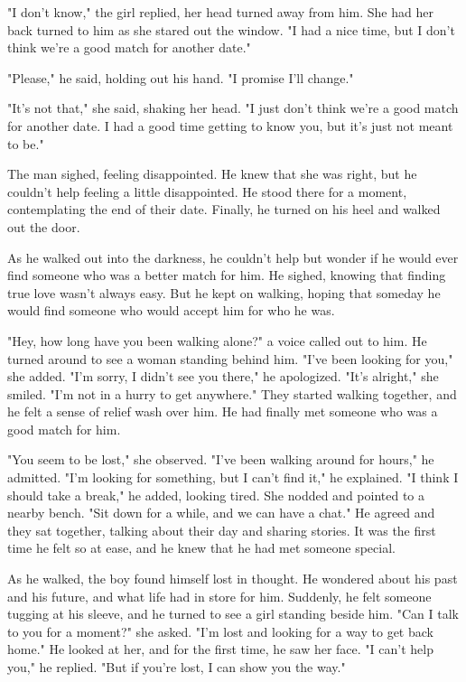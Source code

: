 \documentclass[smalldemyvopaper,11pt,twoside,onecolumn,openright,extrafontsizes]{memoir}
\begin{document}
"I don't know," the girl replied, her head turned away from him. She had her back turned to him as she stared out the window. "I had a nice time, but I don't think we're a good match for another date."\par
"Please," he said, holding out his hand. "I promise I'll change."\par
"It's not that," she said, shaking her head. "I just don't think we're a good match for another date. I had a good time getting to know you, but it's just not meant to be."\par
The man sighed, feeling disappointed. He knew that she was right, but he couldn't help feeling a little disappointed. He stood there for a moment, contemplating the end of their date. Finally, he turned on his heel and walked out the door.\par
As he walked out into the darkness, he couldn't help but wonder if he would ever find someone who was a better match for him. He sighed, knowing that finding true love wasn't always easy. But he kept on walking, hoping that someday he would find someone who would accept him for who he was.\par
"Hey, how long have you been walking alone?" a voice called out to him. He turned around to see a woman standing behind him. "I've been looking for you," she added. "I'm sorry, I didn't see you there," he apologized. "It's alright," she smiled. "I'm not in a hurry to get anywhere." They started walking together, and he felt a sense of relief wash over him. He had finally met someone who was a good match for him.\par
"You seem to be lost," she observed. "I've been walking around for hours," he admitted. "I'm looking for something, but I can't find it," he explained. "I think I should take a break," he added, looking tired. She nodded and pointed to a nearby bench. "Sit down for a while, and we can have a chat." He agreed and they sat together, talking about their day and sharing stories. It was the first time he felt so at ease, and he knew that he had met someone special.\par
As he walked, the boy found himself lost in thought. He wondered about his past and his future, and what life had in store for him. Suddenly, he felt someone tugging at his sleeve, and he turned to see a girl standing beside him. "Can I talk to you for a moment?" she asked. "I'm lost and looking for a way to get back home." He looked at her, and for the first time, he saw her face. "I can't help you," he replied. "But if you're lost, I can show you the way."\par
\end{document}
